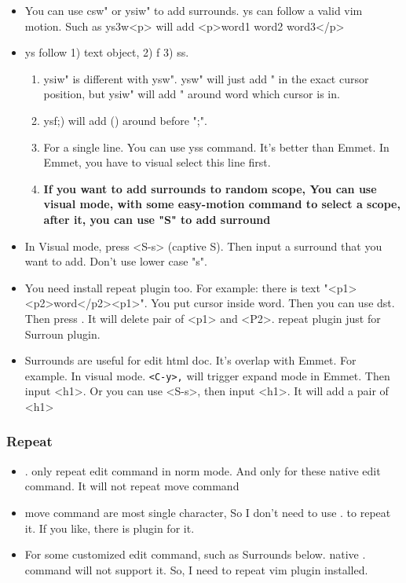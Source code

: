 \documentclass[a4paper,12pt,twoside]{book}
\begin{document}
\begin{itemize}
	   \item You can use csw" or ysiw" to add surrounds. ys can follow a valid vim motion. Such as ys3w<p> will add <p>word1 word2 word3</p>
	   \item ys follow 1) text object, 2) f 3) ss.
			   \begin{enumerate}
						\item ysiw" is different with ysw". ysw" will just add " in the exact cursor position, but ysiw" will add " around word which cursor is in. 

						\item ysf;) will add () around before ";".

						\item For a single line. You can use yss command. It's better than Emmet. In Emmet, you have to visual select this line first.  
						\item \textbf{If you want to add surrounds to random scope, You can use visual mode, with some easy-motion command to select a scope, after it, you can use "S" to add surround}

				\end{enumerate}
	   \item In Visual mode, press <S-s> (captive S). Then input a surround that you want to add. Don't use lower case "s". 
	   \item You need install repeat plugin too. For example: there is text "<p1><p2>word</p2><p1>". You put cursor inside word. Then you can use dst. Then press . It will delete pair of <p1> and <P2>. repeat plugin just for Surroun plugin. 
	    
	    \item Surrounds are useful for edit html doc. It's overlap with Emmet. For example. In visual mode. \verb=<C-y>,= will trigger expand mode in Emmet. Then input <h1>. Or you can use <S-s>, then input <h1>. It will add a pair of <h1> 
\end{itemize}

\subsubsection{Repeat}
\begin{itemize}
		\item . only repeat edit command in norm mode. And only for these native edit command. It will not repeat move command

		\item move command are most single character, So I don't need to use . to repeat it. If you like, there is plugin for it. 

		\item For some customized edit command, such as Surrounds below. native . command will not support it. So, I need to repeat vim plugin installed. 
\end{itemize}
\end{document}
